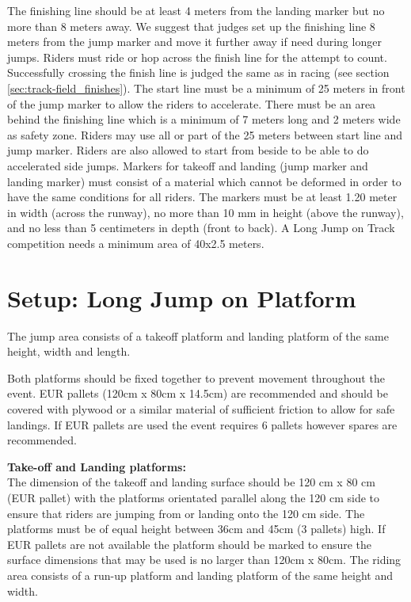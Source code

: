 The finishing line should be at least 4 meters from the landing marker but no more than 8 meters away.
We suggest that judges set up the finishing line 8 meters from the jump marker and move it further away if need during longer jumps.
Riders must ride or hop across the finish line for the attempt to count.
Successfully crossing the finish line is judged the same as in racing (see section \ref{sec:track-field_finishes}).
The start line must be a minimum of 25 meters in front of the jump marker to allow the riders to accelerate.
There must be an area behind the finishing line which is a minimum of 7 meters long and 2 meters wide as safety zone.
Riders may use all or part of the 25 meters between start line and jump marker.
Riders are also allowed to start from beside to be able to do accelerated side jumps.
Markers for takeoff and landing (jump marker and landing marker) must consist of a material which cannot be deformed in order to have the same conditions for all riders.
The markers must be at least 1.20 meter in width (across the runway), no more than 10 mm in height (above the runway), and no less than 5 centimeters in depth (front to back).
A Long Jump on Track competition needs a minimum area of 40x2.5 meters.

\section{Setup: Long Jump on Platform}
The jump area consists of a takeoff platform and landing platform of the same height, width and length.

Both platforms should be fixed together to prevent movement throughout the event.
EUR pallets (120cm x 80cm x 14.5cm) are recommended and should be covered with plywood or a similar material of sufficient friction to allow for safe landings.
If EUR pallets are used the event requires 6 pallets however spares are recommended.

\textbf{Take-off and Landing platforms:}\\
The dimension of the takeoff and landing surface should be 120 cm x 80 cm (EUR pallet) with the platforms orientated parallel along the 120 cm side to ensure that riders are jumping from or landing onto the 120 cm side.
The platforms must be of equal height between 36cm and 45cm (3 pallets) high.
If EUR pallets are not available the platform should be marked to ensure the surface dimensions that may be used is no larger than 120cm x 80cm.
The riding area consists of a run-up platform and landing platform of the same height and width.
